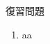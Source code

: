 \documentclass[12pt,a4paper]{jsarticle}
\begin{document}
復習問題
\begin{enumerate}
    \item aa
\end{enumerate}
\end{document}
